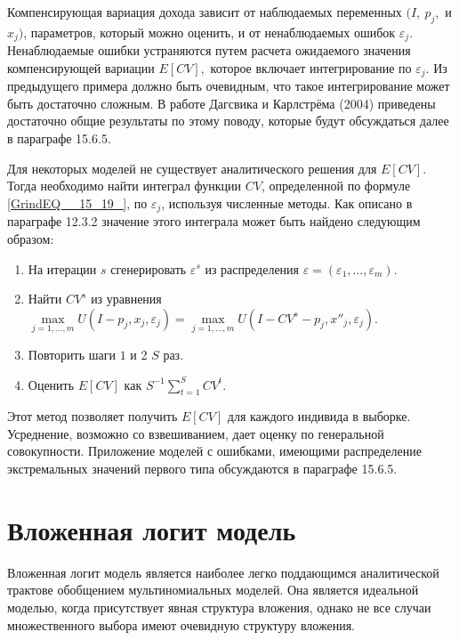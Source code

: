 Компенсирующая вариация дохода зависит от наблюдаемых переменных $(I,\ p_j,$ и $x_j)$,  параметров, который можно оценить, и от ненаблюдаемых ошибок ${\varepsilon }_j.$ Ненаблюдаемые ошибки устраняются путем расчета ожидаемого значения компенсирующей вариации $E\left[CV\right],$ которое включает интегрирование по ${\varepsilon }_j$. Из предыдущего примера должно быть очевидным, что такое интегрирование может быть достаточно сложным. В работе Дагсвика и Карлстрёма (2004) приведены достаточно общие результаты по этому поводу, которые будут обсуждаться далее в параграфе 15.6.5.

Для некоторых моделей не существует аналитического решения для $E\left[CV\right].$ Тогда необходимо найти интеграл функции $CV$, определенной по формуле \eqref{GrindEQ__15_19_}, по ${\varepsilon }_j$, используя численные методы. Как описано в параграфе 12.3.2 значение этого интеграла может быть найдено следующим образом:

\begin{enumerate}
\item  На итерации $s$ сгенерировать ${\varepsilon }^s$ из распределения $\varepsilon =\left({\varepsilon }_1,\dots ,{\varepsilon }_m\right).$

\item  Найти $CV^s$ из уравнения $\underset{j=1,\dots ,m}{\max } 
U\left(I-p_j,x_j,{\varepsilon }_j\right)=
\underset{j=1,\dots ,m}{\max } U\left(I-CV^s-p_j,x''_j,{\varepsilon }_j\right).\ $

\item  Повторить шаги $1$ и 2 $S$ раз.

\item  Оценить $E[CV]$ как $S^{-1}\sum^S_{t=1}{CV^t}.$
\end{enumerate}

Этот метод позволяет получить $E\left[CV\right]$ для каждого индивида в выборке. Усреднение, возможно со взвешиванием, дает оценку по генеральной совокупности. Приложение моделей с ошибками, имеющими распределение экстремальных значений первого типа обсуждаются в параграфе 15.6.5.

\section{Вложенная логит модель}

Вложенная логит модель является наиболее легко поддающимся аналитической трактове обобщением мультиномиальных моделей. Она является идеальной моделью, когда присутствует явная структура вложения, однако не все случаи множественного выбора имеют очевидную структуру вложения. 

